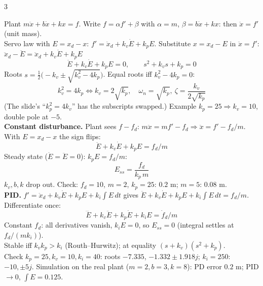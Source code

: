 \begin{multicols}{3}
\begin{fbx}
Plant $m\ddot x+b\dot x+kx=f$. Write $f=\alpha f'+\beta$ with $\alpha=m$, $\beta=b\dot x+kx$: then $\ddot x=f'$ (unit mass).\\
Servo law with $E=x_d-x$: $f'=\ddot x_d+k_v\dot E+k_pE$. Substitute $x=x_d-E$ in $\ddot x=f'$:\\
$\ddot x_d-\ddot E=\ddot x_d+k_v\dot E+k_pE$
\[\ddot E+k_v\dot E+k_pE=0,\qquad s^2+k_vs+k_p=0\]
Roots $s=\tfrac12\big(-k_v\pm\sqrt{k_v^2-4k_p}\big)$. Equal roots iff $k_v^2-4k_p=0$:
\[k_v^2=4k_p\iff k_v=2\sqrt{k_p},\quad\omega_n=\sqrt{k_p},\ \zeta=\frac{k_v}{2\sqrt{k_p}}\]
(The slide's ``$k_p^2=4k_v$'' has the subscripts swapped.) Example $k_p=25\Rightarrow k_v=10$, double pole at $-5$.\\
\textbf{Constant disturbance.} Plant sees $f-f_d$: $m\ddot x=mf'-f_d\Rightarrow\ddot x=f'-f_d/m$. With $E=x_d-x$ the sign flips:
\[\ddot E+k_v\dot E+k_pE=f_d/m\]
Steady state ($\dot E=\ddot E=0$): $k_pE=f_d/m$:
\[E_{ss}=\frac{f_d}{k_p\,m}\]
$k_v,b,k$ drop out. Check: $f_d=10$, $m=2$, $k_p=25$: $0.2$ m; $m=5$: $0.08$ m.\\
\textbf{PID.} $f'=\ddot x_d+k_v\dot E+k_pE+k_i\!\int\!E\,dt$ gives $\ddot E+k_v\dot E+k_pE+k_i\!\int\!E\,dt=f_d/m$. Differentiate once:
\[\dddot E+k_v\ddot E+k_p\dot E+k_iE=\dot f_d/m\]
Constant $f_d$: all derivatives vanish, $k_iE=0$, so $E_{ss}=0$ (integral settles at $f_d/(mk_i)$).\\
Stable iff $k_vk_p>k_i$ (Routh--Hurwitz); at equality $(s+k_v)(s^2+k_p)$.\\
Check $k_p=25,k_v=10,k_i=40$: roots $-7.335$, $-1.332\pm1.918j$; $k_i=250$: $-10,\pm5j$. Simulation on the real plant ($m=2,b=3,k=8$): PD error $0.2$ m; PID $\to0$, $\int E=0.125$. \chk
\end{fbx}


\end{multicols}
